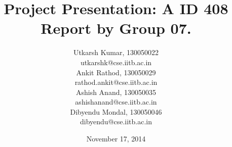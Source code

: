 \title{Project Presentation: A ID 408 Report by Group 07.}
\author{Utkarsh Kumar, 130050022 \linebreak \\
		utkarshk@cse.iitb.ac.in \linebreak \\
		Ankit Rathod, 130050029 \linebreak \\
		rathod.ankit@cse.iitb.ac.in \linebreak \\
		Ashish Anand, 130050035 \linebreak \\
		ashishanand@cse.iitb.ac.in \linebreak \\
		Dibyendu Mondal, 130050046 \linebreak \\
		dibyendu@cse.iitb.ac.in \linebreak \\
}
\date{November 17, 2014}

\begin{frame}
\titlepage
\end{frame}
